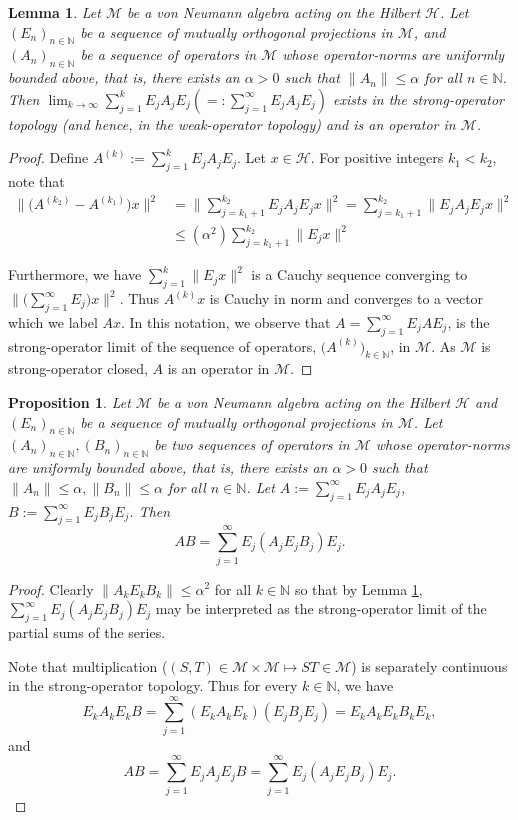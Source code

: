\documentclass[12pt, preprint]{amsart}
\newtheorem{prop}[thm]{Proposition}
\newtheorem{lem}[thm]{Lemma}
\newcommand{\N}{\mathbb{N}}
\theoremstyle{definition}
\theoremstyle{remark}
\numberwithin{equation}{section}
\theoremstyle{ser}
\theoremstyle{serr}
\theoremstyle{ser}
\begin{document}
\begin{lem}
\label{lem:inf_div1}
\textsl{
Let $\mathscr{M}$ be a von Neumann algebra acting on the Hilbert $\mathscr{H}$. Let $(E_n)_{n \in \N}$ be a sequence of mutually orthogonal projections in $\mathscr{M}$, and $(A_n)_{n \in \N}$ be a sequence of operators in $\mathscr{M}$ whose operator-norms are uniformly bounded above, that is, there exists an $\alpha > 0$ such that $\|A_n \| \le \alpha$ for all $n \in \N$. Then $\lim_{k \to \infty} \sum_{j=1}^{k} E_j A_j E_j (=: \sum_{j=1}^{\infty} E_j A_j E_j) $ exists in the strong-operator topology (and hence, in the weak-operator topology) and is an operator in $\mathscr{M}$.
}
\end{lem}
\begin{proof}
Define $A^{(k)} := \sum_{j=1}^{k} E_j A_j E_j$. Let $x \in \mathscr{H}$.
For positive integers $k_1 < k_2$, note that 
\begin{align*}
  \big\| \big( A^{(k_2)} - A^{(k_1)} \big) x \big\|^2 &= \Big\| \sum_{j=k_1+1}^{k_2} E_j A_j E_j x \Big\|^2 = \sum_{j=k_1 + 1}^{k_2} \|E_j A_j E_j x\|^2 \\
  &\le (\alpha ^2) \sum_{j=k_1 + 1}^{k_2} \|E_j x\|^2 
\end{align*}

Furthermore, we have $\sum_{j=1}^k \|E_j x\|^2$ is a Cauchy sequence converging to $\big\| \big( \sum_{j=1}^{\infty} E_j \big) x \big\|^2$. Thus $A^{(k)}x$ is Cauchy in norm and converges to a vector which we label $Ax$. In this notation, we observe that $A = \sum_{j=1}^{\infty} E_j A E_j$, is the strong-operator limit of the sequence of operators, $\big( A^{(k)} \big)_{k \in \N}$, in $\mathscr{M}$. As $\mathscr{M}$ is strong-operator closed, $A$ is an operator in $\mathscr{M}$.
\end{proof}


\begin{prop}
\label{prop:diag_prod}
\textsl{
Let $\mathscr{M}$ be a von Neumann algebra acting on the Hilbert $\mathscr{H}$ and $(E_n)_{n \in \N}$ be a sequence of mutually orthogonal projections in $\mathscr{M}$. Let $(A_n)_{n \in \N}, (B_n)_{n \in \N}$ be two sequences of operators in $\mathscr{M}$ whose operator-norms are uniformly bounded above, that is, there exists an $\alpha > 0$ such that $\|A_n \| \le \alpha, \|B_n\| \le \alpha$ for all $n \in \N$. Let $A := \sum_{j=1}^{\infty} E_j A_j E_j$, $B := \sum_{j=1}^{\infty} E_j B_j E_j$. Then $$AB = \sum_{j=1}^{\infty} E_j (A_j E_j B_j)E_j.$$}
\end{prop}
\begin{proof}
Clearly $\|A_k E_k B_k \| \le \alpha ^2$ for all $k \in \N$ so that by Lemma \ref{lem:inf_div1}, $\sum_{j=1}^{\infty} E_j (A_j E_j B_j)E_j$ may be interpreted as the strong-operator limit of the partial sums of the series.

Note that multiplication ($(S, T) \in \mathscr{M} \times \mathscr{M} \mapsto ST \in \mathscr{M}$) is separately continuous in the strong-operator topology. Thus for every $k \in \N$, we have $$E_k A_k E_k B = \sum_{j=1}^{\infty} (E_k A_k E_k) (E_j B_j E_j) = E_k A_k E_k B_k E_k,$$ and 
$$AB = \sum_{j=1}^{\infty} E_j A_j E_j B = \sum_{j=1}^{\infty} E_j (A_j E_j B_j) E_j.$$
\end{proof}
\end{document}
